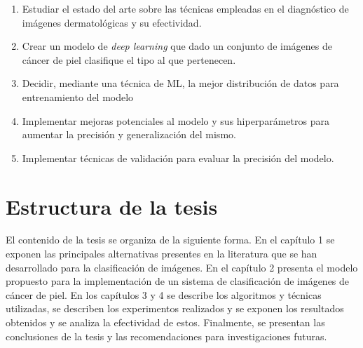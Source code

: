 \begin{enumerate}
    \item Estudiar el estado del arte sobre las técnicas empleadas en el diagnóstico de imágenes dermatológicas y su efectividad.
    \item Crear un modelo de \textit{deep learning} que dado un conjunto de imágenes de cáncer de piel clasifique el tipo al que pertenecen.
    \item Decidir, mediante una técnica de ML, la mejor distribución de datos para entrenamiento del modelo 
    \item Implementar mejoras potenciales al modelo y sus hiperparámetros para aumentar la precisión y generalización del mismo.
    \item Implementar técnicas de validación para evaluar la precisión del modelo.
\end{enumerate}

\section*{Estructura de la tesis}

El contenido de la tesis se organiza de la siguiente forma. En el capítulo 1 se exponen las principales alternativas presentes en la literatura que se han desarrollado para la clasificación de imágenes. En el capítulo 2 presenta el modelo propuesto para la implementación de un sistema de clasificación de imágenes de cáncer de piel. En los capítulos 3 y 4 se describe  los algoritmos y técnicas utilizadas, se describen los experimentos realizados y se exponen los resultados obtenidos y se analiza la efectividad de estos. Finalmente, se presentan las conclusiones de la tesis y las recomendaciones para investigaciones futuras.